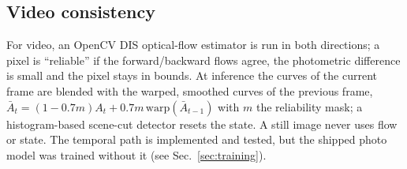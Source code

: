 \documentclass{article}
\begin{document}
\subsection{Video consistency}
For video, an OpenCV DIS optical-flow estimator is run in both directions; a pixel is ``reliable'' if the forward/backward flows agree, the photometric difference is small and the pixel stays in bounds. At inference the curves of the current frame are blended with the warped, smoothed curves of the previous frame, $\bar A_t=(1-0.7m)A_t+0.7m\,\mathrm{warp}(\bar A_{t-1})$ with $m$ the reliability mask; a histogram-based scene-cut detector resets the state. A still image never uses flow or state. The temporal path is implemented and tested, but the shipped photo model was trained without it (see Sec.~\ref{sec:training}).

\end{document}

